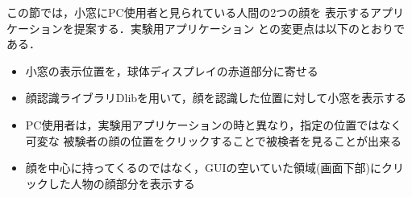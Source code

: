 この節では，小窓にPC使用者と見られている人間の2つの顔を
表示するアプリケーションを提案する．実験用アプリケーション
との変更点は以下のとおりである．
\begin{itemize}
  \item 小窓の表示位置を，球体ディスプレイの赤道部分に寄せる
  \item 顔認識ライブラリDlib\cite{12}を用いて，顔を認識した位置に対して小窓を表示する
  \item PC使用者は，実験用アプリケーションの時と異なり，指定の位置ではなく可変な
  被験者の顔の位置をクリックすることで被検者を見ることが出来る
  \item 顔を中心に持ってくるのではなく，GUIの空いていた領域(画面下部)にクリックした人物の顔部分を表示する
\end{itemize}

